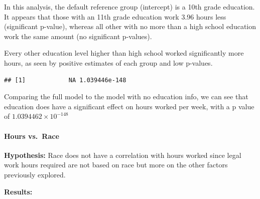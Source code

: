 \documentclass[]{article}
\newenvironment{Shaded}{\begin{snugshade}}{\end{snugshade}}
\newcommand{\KeywordTok}[1]{\textcolor[rgb]{0.13,0.29,0.53}{\textbf{#1}}}
\newcommand{\NormalTok}[1]{#1}
\newcommand{\OperatorTok}[1]{\textcolor[rgb]{0.81,0.36,0.00}{\textbf{#1}}}
\let\oldparagraph\paragraph
\renewcommand{\paragraph}[1]{\oldparagraph{#1}\mbox{}}
\begin{document}
In this analysis, the default reference group (intercept) is a 10th
grade education. It appears that those with an 11th grade education work
3.96 hours less (significant p-value), whereas all other with no more
than a high school education work the same amount (no significant
p-values).

Every other education level higher than high school worked significantly
more hours, as seen by positive estimates of each group and low
p-values.

\begin{Shaded}
\end{Shaded}

\begin{verbatim}
## [1]            NA 1.039446e-148
\end{verbatim}

Comparing the full model to the model with no education info, we can see
that education does have a significant effect on hours worked per week,
with a p value of \ensuremath{1.0394462\times 10^{-148}}

\hypertarget{hours-vs.-race}{%
\paragraph{Hours vs.~Race}\label{hours-vs.-race}}

\textbf{Hypothesis:} Race does not have a correlation with hours worked
since legal work hours required are not based on race but more on the
other factors previously explored.

\textbf{Results:}
\end{document}

